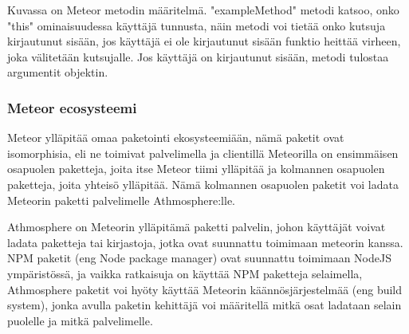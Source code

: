 Kuvassa on Meteor metodin määritelmä. "exampleMethod"{} metodi katsoo, onko "this"{} ominaisuudessa käyttäjä tunnusta, 
näin metodi voi tietää onko kutsuja kirjautunut sisään,
jos käyttäjä ei ole kirjautunut sisään funktio heittää virheen, joka välitetään kutsujalle.
Jos käyttäjä on kirjautunut sisään, metodi tulostaa argumentit objektin. 
\medskip




\subsubsection{Meteor ecosysteemi}



Meteor ylläpitää omaa paketointi ekosysteemiään, nämä
paketit ovat isomorphisia, eli ne toimivat palvelimella ja clientillä 
Meteorilla on ensimmäisen osapuolen paketteja, joita itse Meteor tiimi ylläpitää ja kolmannen osapuolen paketteja,
joita yhteisö ylläpitää. Nämä kolmannen osapuolen paketit voi ladata Meteorin paketti palvelimelle Athmosphere:lle. 
\medskip


Athmosphere on Meteorin ylläpitämä paketti palvelin, johon käyttäjät voivat ladata paketteja tai kirjastoja, jotka ovat suunnattu toimimaan meteorin kanssa.
NPM paketit (eng Node package manager) ovat suunnattu toimimaan NodeJS ympäristössä, ja vaikka ratkaisuja on käyttää NPM paketteja selaimella, 
Athmosphere paketit voi hyöty käyttää Meteorin käännösjärjestelmää (eng build system), jonka avulla paketin kehittäjä voi määritellä mitkä osat ladataan selain puolelle ja mitkä palvelimelle.

